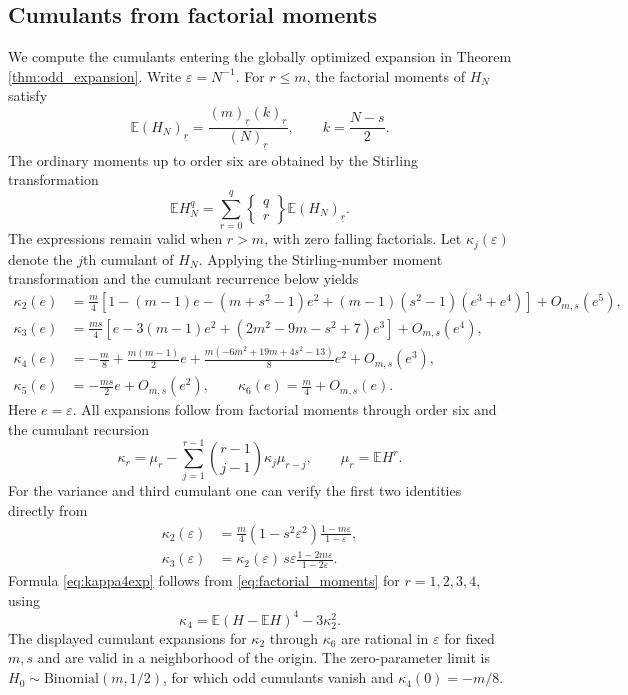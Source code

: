 \documentclass[11pt,a4paper]{article}
\newcommand{\E}{\mathbb E}\newcommand{\R}{\mathbb R}\newcommand{\N}{\mathbb N}\newcommand{\one}{\mathbf1}
\begin{document}
\subsection{Cumulants from factorial moments}\label{sec:cumulants_odd}
We compute the cumulants entering the globally optimized expansion in Theorem \ref{thm:odd_expansion}. Write $\varepsilon=N^{-1}$. For $r\le m$, the factorial moments of $H_N$ satisfy
\begin{equation}\label{eq:factorial_moments}
 \E(H_N)_{\underline r}
 =\frac{(m)_{\underline r}(k)_{\underline r}}
 {(N)_{\underline r}},\qquad k=\frac{N-s}{2}.
\end{equation}
The ordinary moments up to order six are obtained by the Stirling transformation
\[
 \E H_N^q=\sum_{r=0}^q\left\{\begin{matrix}q\\r\end{matrix}\right\}
 \E(H_N)_{\underline r}.
\]
The expressions remain valid when $r>m$, with zero falling factorials. Let $\kappa_j(\varepsilon)$ denote the $j$th cumulant of $H_N$. Applying the Stirling-number moment transformation and the cumulant recurrence below yields
\begin{align}
 \kappa_2(e)&=\frac m4\left[1-(m-1)e-(m+s^2-1)e^2
 +(m-1)(s^2-1)(e^3+e^4)\right]+O_{m,s}(e^5),\label{eq:kappa2exp}\\
 \kappa_3(e)&=\frac{ms}{4}\left[e-3(m-1)e^2
 +(2m^2-9m-s^2+7)e^3\right]+O_{m,s}(e^4),\label{eq:kappa3exp}\\
 \kappa_4(e)&=-\frac m8+\frac{m(m-1)}2e
 +\frac{m(-6m^2+19m+4s^2-13)}8e^2+O_{m,s}(e^3),\label{eq:kappa4exp}\\
 \kappa_5(e)&=-\frac{ms}{2}e+O_{m,s}(e^2),\qquad
 \kappa_6(e)=\frac m4+O_{m,s}(e).\label{eq:kappa56exp}
\end{align}
Here $e=\varepsilon$. All expansions follow from factorial moments through order six and the cumulant recursion
\[
 \kappa_r=\mu_r-\sum_{j=1}^{r-1}\binom{r-1}{j-1}\kappa_j\mu_{r-j},
 \qquad \mu_r=\E H^r.
\]
For the variance and third cumulant one can verify the first two identities directly from
\begin{align}
 \kappa_2(\varepsilon)
 &=\frac m4(1-s^2\varepsilon^2)\frac{1-m\varepsilon}{1-\varepsilon},\label{eq:exactk2}\\
 \kappa_3(\varepsilon)
 &=\kappa_2(\varepsilon)\,s\varepsilon
 \frac{1-2m\varepsilon}{1-2\varepsilon}.
 \label{eq:exactk3}
\end{align}
Formula \eqref{eq:kappa4exp} follows from \eqref{eq:factorial_moments} for $r=1,2,3,4$, using
\[
 \kappa_4=\E(H-\E H)^4-3\kappa_2^2.
\]
The displayed cumulant expansions for $\kappa_2$ through $\kappa_6$ are rational in $\varepsilon$ for fixed $m,s$ and are valid in a neighborhood of the origin. The zero-parameter limit is $H_0\sim\mathrm{Binomial}(m,1/2)$, for which odd cumulants vanish and $\kappa_4(0)=-m/8$.
\end{document}

